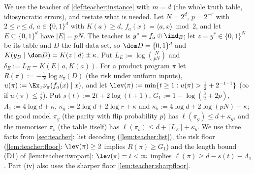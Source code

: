 We use the teacher of \cref{def:teacher:instance} with $m=d$ (the whole truth table, idiosyncratic errors), and restate what is needed. Let $N=2^d$, $p=2^{-r}$ with $2\le r\le d$, $a\in\{0,1\}^d$ with $K(a)\ge d$, $f_a(x)=\langle a,x\rangle\bmod2$, and let $E\subseteq\{0,1\}^d$ have $|E|=pN$. The teacher is $y^*=f_a\oplus\ind_E$; let $z=y^*\in\{0,1\}^N$ be its table and $D$ the full data set, so $\dom D=\{0,1\}^d$ and $K(y_D\mid\dom D)=K(z\mid d)\pm\kappa$. Put $L_E:=\log\binom N{pN}$ and $\delta_E:=L_E-K(E\mid a,K(a))$. For a product program $\pi$ let $R(\pi):=-\frac1N\log\nu_\pi(D)$ (the risk under uniform inputs), $u(\pi):=\Ex_x\nu_\pi(f_a(x)\mid x)$, and let $\lev(\pi):=\min\{t\ge1:u(\pi)>\frac12+2^{-t-1}\}$ ($\infty$ if $u(\pi)\le\frac12$). Put $s(t):=2t+2\log(t+1)$, $G_1:=1-\log(\frac32+2p)$, $\Lambda_1:=4\log d+\kappa$, $\kappa_g:=2\log d+2\log r+\kappa$ and $\kappa_b:=4\log d+2\log(pN)+\kappa$; the good model $\pi_g$ (the parity with flip probability $p$) has $\ell(\pi_g)\le d+\kappa_g$, and the memoriser $\pi_b$ (the table itself) has $\ell(\pi_b)\le d+\lceil L_E\rceil+\kappa_b$. We use three facts from \cref{sec:teacher}: list decoding (\cref{lem:teacher:list}), the risk floor (\cref{lem:teacher:floor}: $\lev(\pi)\ge2$ implies $R(\pi)\ge G_1$) and the length bound (D1) of \cref{lem:teacher:twopart}: $\lev(\pi)=t<\infty$ implies $\ell(\pi)\ge d-s(t)-\Lambda_1$. Part (iv) also uses the sharper floor \cref{lem:teacher:sharpfloor}.

